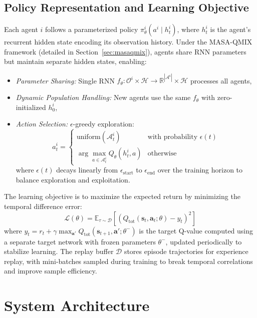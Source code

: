 \subsection{Policy Representation and Learning Objective}
Each agent \( i \) follows a parameterized policy \( \pi_\theta^i(a^i \mid h_t^i) \), where \( h_t^i \) is the agent's recurrent hidden state encoding its observation history. Under the MASA-QMIX framework (detailed in Section~\ref{sec:masaqmix}), agents share RNN parameters but maintain separate hidden states, enabling:
\begin{itemize}
    \item \textit{Parameter Sharing:} Single RNN \( f_\theta: \mathcal{O}^i \times \mathcal{H} \rightarrow \mathbb{R}^{|\mathcal{A}^i|} \times \mathcal{H} \) processes all agents,
    \item \textit{Dynamic Population Handling:} New agents use the same \( f_\theta \) with zero-initialized \( h_0^i \),
    \item \textit{Action Selection:} \( \epsilon \)-greedy exploration:
    \[
    a_t^i = 
    \begin{cases}
    \text{uniform}(\mathcal{A}_t^i) & \text{with probability } \epsilon(t) \\
    \arg\max_{a \in \mathcal{A}_t^i} Q_\theta(h_t^i, a) & \text{otherwise}
    \end{cases}
    \]
    where \( \epsilon(t) \) decays linearly from \( \epsilon_{\text{start}} \) to \( \epsilon_{\text{end}} \) over the training horizon to balance exploration and exploitation.
\end{itemize}

The learning objective is to maximize the expected return by minimizing the temporal difference error:
\[
\mathcal{L}(\theta) = \mathbb{E}_{\tau \sim \mathcal{D}} \left[ \left( Q_{\text{tot}}(\mathbf{s}_t, \mathbf{a}_t; \theta) - y_t \right)^2 \right]
\]
where \( y_t = r_t + \gamma \max_{\mathbf{a}'} Q_{\text{tot}}(\mathbf{s}_{t+1}, \mathbf{a}'; \theta^-) \) is the target Q-value computed using a separate target network with frozen parameters \( \theta^- \), updated periodically to stabilize learning. The replay buffer \( \mathcal{D} \) stores episode trajectories for experience replay, with mini-batches sampled during training to break temporal correlations and improve sample efficiency.

\section{System Architecture}
\label{sec:architecture}

